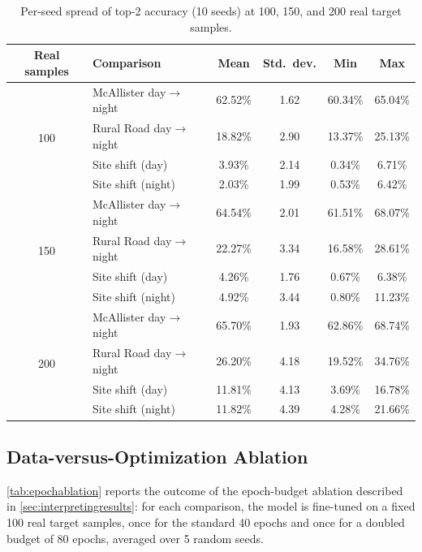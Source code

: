 \documentclass{iutbscthesis}
\begin{document}
\begin{table}[H]
    \centering
    \begin{tabular}{c l c c c c}
        \toprule
        Real samples & Comparison & Mean & Std.\ dev. & Min & Max \\
        \midrule
        \multirow{4}{*}{100}
        & McAllister day$\to$night & 62.52\% & 1.62 & 60.34\% & 65.04\% \\
        & Rural Road day$\to$night & 18.82\% & 2.90 & 13.37\% & 25.13\% \\
        & Site shift (day) & 3.93\% & 2.14 & 0.34\% & 6.71\% \\
        & Site shift (night) & 2.03\% & 1.99 & 0.53\% & 6.42\% \\
        \midrule
        \multirow{4}{*}{150}
        & McAllister day$\to$night & 64.54\% & 2.01 & 61.51\% & 68.07\% \\
        & Rural Road day$\to$night & 22.27\% & 3.34 & 16.58\% & 28.61\% \\
        & Site shift (day) & 4.26\% & 1.76 & 0.67\% & 6.38\% \\
        & Site shift (night) & 4.92\% & 3.44 & 0.80\% & 11.23\% \\
        \midrule
        \multirow{4}{*}{200}
        & McAllister day$\to$night & 65.70\% & 1.93 & 62.86\% & 68.74\% \\
        & Rural Road day$\to$night & 26.20\% & 4.18 & 19.52\% & 34.76\% \\
        & Site shift (day) & 11.81\% & 4.13 & 3.69\% & 16.78\% \\
        & Site shift (night) & 11.82\% & 4.39 & 4.28\% & 21.66\% \\
        \bottomrule
    \end{tabular}
    \caption{Per-seed spread of top-2 accuracy (10 seeds) at 100, 150, and 200 real target samples.}
    \label{tab:stage1variance}
\end{table}

\subsection{Data-versus-Optimization Ablation}

\autoref{tab:epochablation} reports the outcome of the epoch-budget ablation described in \autoref{sec:interpretingresults}: for each comparison, the model is fine-tuned on a fixed 100 real target samples, once for the standard 40 epochs and once for a doubled budget of 80 epochs, averaged over 5 random seeds.
\end{document}
